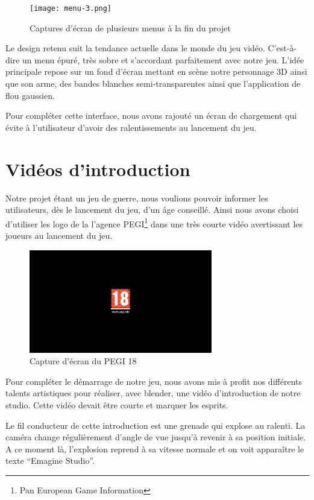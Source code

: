 \documentclass[11pt]{report}
\begin{document}
\begin{figure}[htbp]
\centering
\texttt{[image: menu-3.png]}
\caption{Captures d'écran de plusieurs menus à la fin du projet}
\end{figure}

Le design retenu suit la tendance actuelle dans le monde du jeu vidéo. C'est-à-dire un menu épuré, très sobre et s'accordant parfaitement avec notre jeu. L'idée principale repose sur un fond d'écran mettant en scène notre personnage 3D ainsi que son arme, des bandes blanches semi-transparentes ainsi que l'application de flou gaussien.

Pour compléter cette interface, nous avons rajouté un écran de chargement qui évite à l'utilisateur d'avoir des ralentissements au lancement du jeu.

\section{Vidéos d'introduction}

Notre projet étant un jeu de guerre, nous voulions pouvoir informer les utilisateurs, dès le lancement du jeu, d'un âge conseillé. Ainsi nous avons choisi d'utiliser les logo de la l'agence PEGI\footnote{Pan European Game Information} dans une très courte vidéo avertissant les joueurs au lancement du jeu.

\begin{figure}[htbp]
\centering
\includegraphics[width=8cm]{pegi18.png}
\caption{Capture d'écran du PEGI 18}
\end{figure}

Pour compléter le démarrage de notre jeu, nous avons mis à profit nos différents talents artistiques pour réaliser, avec blender, une vidéo d'introduction de notre studio. Cette vidéo devait être courte et marquer les esprits.

Le fil conducteur de cette introduction est une grenade qui explose au ralenti. La caméra change régulièrement d'angle de vue jusqu'à revenir à sa position initiale. A ce moment là, l'explosion reprend à sa vitesse normale et on voit apparaître le texte ``Emagine Studio''.
\end{document}
